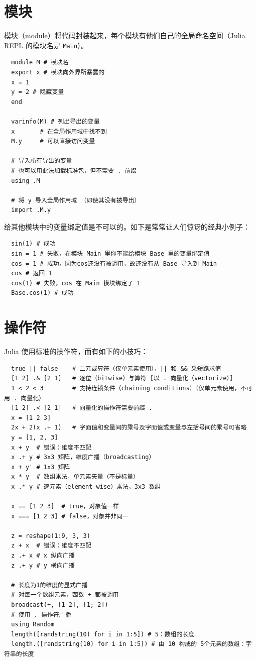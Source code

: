 \documentclass[10pt,a4paper]{article}
\begin{document}
\section{模块}
模块（module）将代码封装起来，每个模块有他们自己的全局命名空间（Julia REPL 的模块名是 \lstinline|Main|）。
\begin{lstlisting}
  module M # 模块名
  export x # 模块向外界所暴露的
  x = 1
  y = 2 # 隐藏变量
  end

  varinfo(M) # 列出导出的变量
  x       # 在全局作用域中找不到
  M.y     # 可以直接访问变量

  # 导入所有导出的变量
  # 也可以用此法加载标准包，但不需要 . 前缀
  using .M

  # 将 y 导入全局作用域 （即使其没有被导出）
  import .M.y
\end{lstlisting}
给其他模块中的变量绑定值是不可以的。如下是常常让人们惊讶的经典小例子：
\begin{lstlisting}
  sin(1) # 成功
  sin = 1 # 失败，在模块 Main 里你不能给模块 Base 里的变量绑定值
  cos = 1 # 成功，因为cos还没有被调用，故还没有从 Base 导入到 Main
  cos # 返回 1
  cos(1) # 失败，cos 在 Main 模块绑定了 1
  Base.cos(1) # 成功
\end{lstlisting}

\section{操作符}
Julia 使用标准的操作符，而有如下的小技巧：
\begin{lstlisting}
  true || false    # 二元或算符（仅单元素使用），|| 和 && 采短路求值
  [1 2] .& [2 1]   # 逐位（bitwise）与算符 [以 . 向量化（vectorize）]
  1 < 2 < 3        # 支持连锁条件（chaining conditions）（仅单元素使用，不可用 . 向量化）
  [1 2] .< [2 1]   # 向量化的操作符需要前缀 .
  x = [1 2 3]
  2x + 2(x .+ 1)   # 字面值和变量间的乘号及字面值或变量与左括号间的乘号可省略
  y = [1, 2, 3]
  x + y  # 错误：维度不匹配
  x .+ y # 3x3 矩阵，维度广播（broadcasting）
  x + y' # 1x3 矩阵
  x * y  # 数组乘法，单元素矢量（不是标量）
  x .* y # 逐元素（element-wise）乘法，3x3 数组

  x == [1 2 3]  # true，对象值一样
  x === [1 2 3] # false，对象并非同一

  z = reshape(1:9, 3, 3)
  z + x  # 错误：维度不匹配
  z .+ x # x 纵向广播
  z .+ y # y 横向广播

  # 长度为1的维度的显式广播
  # 对每一个数组元素，函数 + 都被调用
  broadcast(+, [1 2], [1; 2])
  # 使用 . 操作符广播
  using Random
  length([randstring(10) for i in 1:5]) # 5：数组的长度
  length.([randstring(10) for i in 1:5]) # 由 10 构成的 5个元素的数组：字符串的长度
\end{lstlisting}
\end{document}
